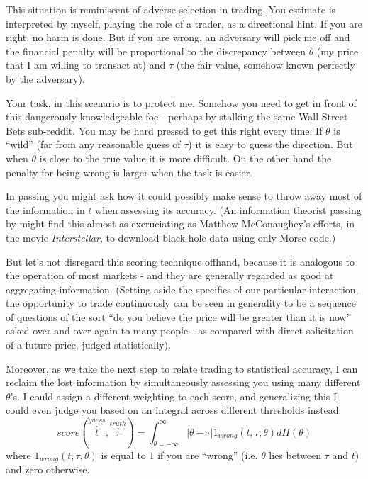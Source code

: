 This situation is reminiscent of adverse selection in trading. You estimate is interpreted by myself, playing the role of a trader, as a directional hint. If you are right, no harm is done. But if you are wrong, an adversary will pick me off and the financial penalty will be proportional to the discrepancy between $\theta$ (my price that I am willing to transact at) and $\tau$ (the fair value, somehow known perfectly by the adversary). 

Your task, in this scenario is to protect me. Somehow you need to get in front of this dangerously knowledgeable foe - perhaps by stalking the same Wall Street Bets sub-reddit. You may be hard pressed to get this right every time. If $\theta$ is ``wild'' (far from any reasonable guess of $\tau$) it is easy to guess the direction. But when $\theta$ is close to the true value it is more difficult. On the other hand the penalty for being wrong is larger when the task is easier.  

In passing you might ask how it could possibly make sense to throw away most of the information in $t$ when assessing its accuracy. (An information theorist passing by might find this almost as excruciating as Matthew McConaughey's efforts, in the movie {\em Interstellar}, to download black hole data using only Morse code.) 

But let's not disregard this scoring technique offhand, because it is analogous to the operation of most markets - and they are generally regarded as good at aggregating information. (Setting aside the specifics of our particular interaction, the opportunity to trade continuously can be seen in generality to be a sequence of questions of the sort ``do you believe the price will be greater than it is now'' asked over and over again to many people - as compared with direct solicitation of a future price, judged statistically). 

Moreover, as we take the next step to relate trading to statistical accuracy, I can reclaim the lost information by simultaneously assessing you using many different $\theta$'s. I could assign a different weighting to each score, and generalizing this I could even judge you based on an integral across different thresholds instead.
$$
       score(\overbrace{t}^{guess},\overbrace{\tau}^{truth}) = \int_{\theta=-\infty}^{\infty} |\theta - \tau|1_{wrong}(t,\tau,\theta) dH(\theta) 
$$
where $1_{wrong}(t,\tau,\theta)$ is equal to $1$ if you are ``wrong'' (i.e. $\theta$ lies between $\tau$ and $t$) and zero otherwise.


